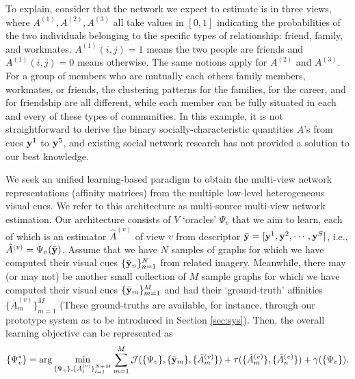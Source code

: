 To explain, consider that the network we expect to estimate is in three views, where $A^{(1)}, A^{(2)}, A^{(3)}$ all take values in $[0,1]$ indicating the probabilities of the two individuals belonging to the specific types of relationship: friend, family, and workmates. $A^{(1)}(i,j)=1$ means the two people are friends and $A^{(1)}(i,j)=0$ means otherwise. The same notions apply for $A^{(2)}$ and $A^{(3)}$. For a group of members who are mutually each others family members, workmates, or friends, the clustering patterns for the families, for the career, and for friendship are all different, while each member can be fully situated in each and every of these types of communities. In this example, it is not straightforward to derive the binary socially-characteristic quantities $A$'s from cues ${\bf y}^1$ to ${\bf y}^5$, and existing social network research has not provided a solution to our best knowledge.

We seek an unified learning-based paradigm to obtain the multi-view network representations (affinity matrices) from the multiple low-level heterogeneous visual cues. We refer to this architecture as multi-source multi-view network estimation. Our architecture consists of $V$ `oracles' $\Psi_{v}$ that we aim to learn, each of which is an estimator $\hat{A}^{(v)}$ of view $v$ from descriptor $\bar{{\bf y}}=[{\bf y}^1,{\bf y}^2, \cdots,{\bf y}^S]$, i.e., $\hat{A}^{(v)}=\Psi_{v}(\bar{{\bf y}})$. Assume that we have $N$ samples of graphs for which we have computed their visual cues $\{\bar{{\bf y}}_{n}\}_{n=1}^{N}$  from related imagery. Meanwhile, there may (or may not) be another small collection of $M$ sample graphs for which we have computed their visual cues $\{\bar{{\bf y}}_{m}\}_{m=1}^{M}$ and had their `ground-truth' affinities $\{\bar{A}^{(v)}_{m}\}_{m=1}^{M}$ (These ground-truths are available, for instance, through our prototype system as to be introduced in Section \ref{sec:sys}). Then, the overall learning objective can be represented as 
\begin{equation}\label{eq:sensing}
\{\Psi^{*}_{v}\}=\arg\min_{\{\Psi_{v}\},\{\hat{A}^{(v)}_l\}_{l=1}^{N+M}}\sum_{m=1}^{M}\mathcal{J}(\{\Psi_{v}\}, \{\bar{{\bf y}}_m\}, \{\bar{A}^{(v)}_m\})+\tau(\{\hat{A}^{(v)}_m\},\{\hat{A}^{(v)}_n\})+\gamma(\{\Psi_{v}\}).
 \end{equation}
 
